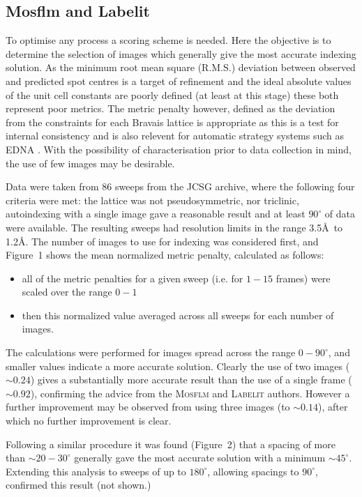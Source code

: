 \documentclass[preprint,pdf]{iucr}
\begin{document}
\subsection{Mosflm and Labelit}

To optimise any process a scoring scheme is needed. Here the objective
is to determine the selection of images which generally give the most
accurate indexing solution. As the minimum root mean square
(R.M.S.) deviation between observed
and predicted spot centres is a target of refinement and the ideal absolute
values of the unit cell constants are poorly defined (at least at this
stage) these both represent poor metrics. The metric penalty however,
defined as the deviation from the constraints for each Bravais lattice
\cite{Grosse-Kunstleve:sh5006} is appropriate as this is a test for
internal consistency 
and is also relevent for automatic strategy systems such as EDNA
\cite{Incardona:wa5014}. With the possibility of characterisation
prior to data collection in mind, the use of few images may be desirable.

Data were taken from 86 sweeps from the JCSG archive, where  the
following four
criteria were met: the lattice was not pseudosymmetric, nor triclinic,
autoindexing with a single image gave a reasonable result and
at least $90^{\circ}$ of data were available. The resulting sweeps had 
resolution limits in the range 3.5\AA\ to 1.2\AA. The number of images
to use for indexing was considered first, and Figure~1
shows the mean normalized metric penalty, calculated as follows:

\begin{itemize}
\item{all of the metric penalties for a
  given sweep (i.e. for $1 - 15$ frames) were scaled over the range $0 - 1$}
\item{then this normalized
  value averaged across all sweeps for each number of images.}
\end{itemize}

\noindent
The calculations were performed for
images spread across the range $0 - 90^{\circ}$, and
smaller values indicate a more accurate solution. Clearly the use of
two images ($\sim 0.24$) gives a substantially more accurate result
than the use of a single frame ($\sim 0.92$), 
confirming the advice from the \textsc{Mosflm} and
\textsc{Labelit} authors. However a further improvement may be observed from
using three images (to $\sim 0.14$), after which no further
improvement is clear.  

Following a similar procedure it was found
(Figure~2) that a 
spacing of more than $\sim 20 - 30^{\circ}$ generally gave the most accurate
solution with a minimum $\sim 45^{\circ}$. 
Extending this analysis to sweeps of up to $180^{\circ}$, allowing
spacings to $90^{\circ}$,
confirmed this result (not shown.) 
\end{document}
